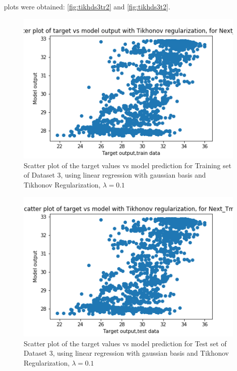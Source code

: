 \documentclass[12pt,a4paper]{article}
\begin{document}
 plots were obtained: \autoref{fig:tikhds3tr2} and \autoref{fig:tikhds3t2}.
\begin{figure}[H]
     \centering
     \includegraphics[scale=0.5]{images/scatter_ds3tikhtrainT_max.png}
     \caption{Scatter plot of the target values vs model prediction for Training set of Dataset 3, using linear regression with gaussian basis and Tikhonov Regularization, $\lambda = 0.1 $}
     \label{fig:tikhds3tr2}
\end{figure}
\begin{figure}[H]
     \centering
     \includegraphics[scale=0.5]{images/scatter_ds3tikhtestT_max.png}
     \caption{Scatter plot of the target values vs model prediction for Test set of Dataset 3, using linear regression with gaussian basis and Tikhonov Regularization, $\lambda = 0.1 $}
     \label{fig:tikhds3t2}
\end{figure}
\end{document}
